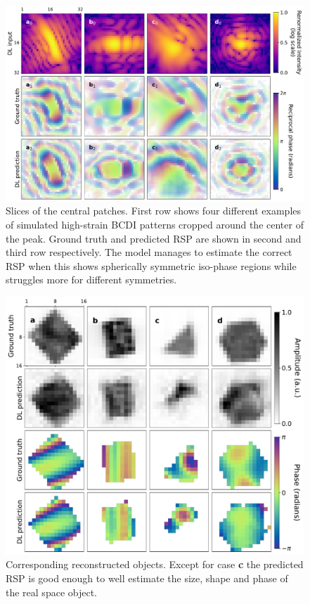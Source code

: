 \begin{figure}[H]
    \centering
    \includegraphics[width=\textwidth]{figures/Phasing/central_patch_highstrain_RSP.pdf}
    \caption{Slices of the central patches. First row shows four different examples of simulated high-strain BCDI patterns cropped around the 
    center of the peak. Ground truth and predicted RSP are shown in second and third row respectively. The model manages 
    to estimate the correct RSP when this shows spherically symmetric iso-phase regions while struggles more for different 
    symmetries. }
    \label{fig:central_highstrain_RSP}
\end{figure}

\begin{figure}[H]
    \centering
    \includegraphics[width=\textwidth]{figures/Phasing/central_patch_highstrain_obj.pdf}
    \caption{Corresponding reconstructed objects. Except for case \textbf{c} the predicted RSP is good enough to well 
    estimate the size, shape and phase of the real space object. }
    \label{fig:central_highstrain_obj}
\end{figure}

